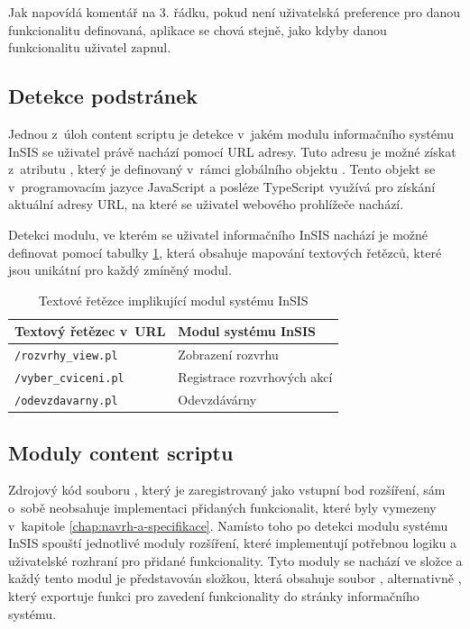 Jak napovídá komentář na 3. řádku, pokud není uživatelská preference pro danou funkcionalitu definovaná, aplikace se chová stejně, jako kdyby danou funkcionalitu uživatel zapnul.

\subsection{Detekce podstránek}

Jednou z~úloh content scriptu je detekce v~jakém modulu informačního systému InSIS se uživatel právě nachází pomocí URL adresy. Tuto adresu je možné získat z~atributu , který je definovaný v~rámci globálního objektu . Tento objekt se v~programovacím jazyce JavaScript a posléze TypeScript využívá pro získání aktuální adresy URL, na které se uživatel webového prohlížeče nachází.


Detekci modulu, ve kterém se uživatel informačního InSIS nachází je možné definovat pomocí tabulky \ref{tab:url-patterny}, která obsahuje mapování textových řetězců, které jsou unikátní pro každý zmíněný modul.

\begin{table}[htbp!]
\centering
\caption{Textové řetězce implikující modul systému InSIS}\label{tab:url-patterny}
    \begin{tabular}{ll}
        \toprule
        \textbf{Textový řetězec v~URL} & \textbf{Modul systému InSIS} \\
        \midrule
        \verb|/rozvrhy_view.pl| & Zobrazení rozvrhu \\
        \verb|/vyber_cviceni.pl| & Registrace rozvrhových akcí \\
        \verb|/odevzdavarny.pl| & Odevzdávárny \\
        \bottomrule
    \end{tabular}
\end{table}

\subsection{Moduly content scriptu}

Zdrojový kód souboru , který je zaregistrovaný jako vstupní bod rozšíření, sám o~sobě neobsahuje implementaci přidaných funkcionalit, které byly vymezeny v~kapitole \ref{chap:navrh-a-specifikace}. Namísto toho po detekci modulu systému InSIS spouští jednotlivé moduly rozšíření, které implementují potřebnou logiku a uživatelské rozhraní pro přidané funkcionality. Tyto moduly se nachází ve složce  a každý tento modul je představován složkou, která obsahuje soubor , alternativně , který exportuje funkci pro zavedení funkcionality do stránky informačního systému. 

